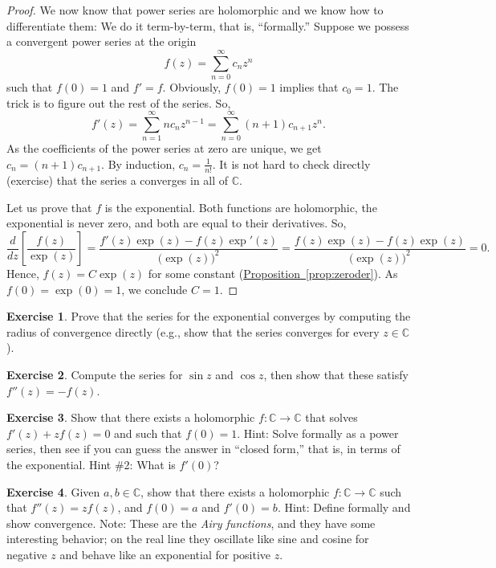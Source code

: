 \documentclass[12pt,openany]{book}
\newcommand{\C}{{\mathbb{C}}}
\newcommand{\myindex}[1]{#1\index{#1}}
\newcommand{\myquote}[1]{``#1''}
\theoremstyle{plain}
\theoremstyle{remark}
\theoremstyle{definition}
\newenvironment{exbox}{%
    \def\FrameCommand{\vrule width 1pt \relax\hspace{10pt}}%
    \MakeFramed{\advance\hsize-\width\FrameRestore}%
}{%
    \endMakeFramed
}
\theoremstyle{exercise}
\newtheorem{exercise}{Exercise}[section]
\theoremstyle{example}
\newcommand{\propref}[1]{\hyperref[#1]{Proposition~\ref*{#1}}}
\begin{document}
\begin{proof}
We now know that power series are holomorphic and we know how
to differentiate them: We do it term-by-term, that is, \myquote{formally.}
Suppose we possess a convergent power series at the origin
\begin{equation*}
f(z) = \sum_{n=0}^\infty c_n z^n
\end{equation*}
such that $f(0)=1$ and $f'=f$.
Obviously, $f(0)=1$ implies that $c_0 = 1$.
The trick is to figure out the rest of the series.
So,
\begin{equation*}
f'(z) =
\sum_{n=1}^\infty n c_n z^{n-1} =
\sum_{n=0}^\infty (n+1) c_{n+1} z^{n} .
\end{equation*}
As the coefficients of the power series at zero are unique, we get
$c_n = (n+1) c_{n+1}$.  By induction, $c_n = \frac{1}{n!}$.
It is not hard to check directly (exercise)
that the series a converges in all of $\C$.

Let us prove that $f$ is the exponential.  Both functions are
holomorphic, the exponential is never zero, and both are equal to their
derivatives.  So,
\begin{equation*}
\frac{d}{dz} \left[ \frac{f(z)}{\exp(z)} \right]
=
\frac{f'(z)\exp(z) - f(z) \exp'(z)}{{\bigl(\exp(z)\bigr)}^2}
=
\frac{f(z)\exp(z) - f(z) \exp(z)}{{\bigl(\exp(z)\bigr)}^2}
= 0.
\end{equation*}
Hence, $f(z) = C \exp(z)$ for some constant (\propref{prop:zeroder}).
As $f(0) = \exp(0) = 1$,
we conclude $C=1$.
\end{proof}

\begin{exbox}
\begin{exercise}
Prove that the series for the exponential converges by computing
the radius of convergence directly
(e.g., show that the series converges for every $z \in \C$).
\end{exercise}

\begin{exercise}
Compute the series for $\sin z$ and $\cos z$, then show that these satisfy
$f''(z) = -f(z)$.
\end{exercise}

\begin{exercise}
Show that there exists a holomorphic $f \colon \C \to \C$ that
solves $f'(z) + z f(z) = 0$ and such that $f(0) = 1$.  Hint: Solve formally
as a power series,
then see if you can guess the answer in \myquote{closed form,} that is, in terms
of the exponential.  Hint \#2: What is $f'(0)$?
\end{exercise}

\begin{exercise}
Given $a,b \in \C$, show that there exists a holomorphic $f \colon \C \to
\C$ such that $f''(z) = z f(z)$, and $f(0) = a$ and $f'(0) = b$.
Hint: Define formally and show convergence.
Note: These are the \emph{\myindex{Airy functions}}, and they have some
interesting behavior; on the real line they oscillate like sine and cosine
for negative $z$ and behave like an exponential for positive $z$.
\end{exercise}
\end{exbox}
\end{document}
